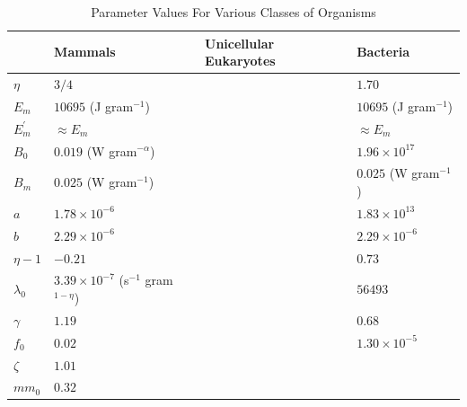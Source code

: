 \documentclass{pnastwo}
\begin{document}
\begin{table}[h]
\caption{Parameter Values For Various Classes of Organisms}
\label{param}
    \begin{center}
    \small
     \begin{tabular}{| p{1.2cm}| p{3.2cm} | p{2.6cm} | p{3.2cm} | }
     \hline
     & {\bf Mammals} & {\bf Unicellular Eukaryotes} & {\bf Bacteria} \\
     \hline
   $\eta$ & $3/4$ & & $1.70$ \\ 
   $E_{m}$ & $10695$ (J gram$^{-1}$) & & $10695$ (J gram$^{-1}$) \\ 
   $E_{m}^{\prime}$ & $\approx E_{m}$ & & $\approx E_{m}$ \\ 
   $B_{0}$ & $0.019$ (W gram$^{-\alpha}$) & & $1.96\times10^{17}$ \\
   $B_{m}$ & $0.025$ (W gram$^{-1}$)   & & $0.025$ (W gram$^{-1}$)\\
   $a$ & $1.78\times10^{-6}$ & & $1.83\times10^{13}$ \\ 
   $b$ & $2.29\times10^{-6}$ & & $2.29\times10^{-6}$ \\  
   $\eta-1$ & $-0.21$ & & $0.73$ \\ 
   $\lambda_{0}$ & $3.39\times10^{-7}$ (s$^{-1}$ gram$^{1-\eta}$) & & $56493$ \\ 
   $\gamma$ & $1.19$ & & $0.68$ \\ 
   $f_{0}$ & $0.02$ & & $1.30\times10^{-5}$ \\ 
   $\zeta$ & $1.01$ & & \\ 
   $mm_{0}$ & $0.32$ & & \\ 
   
      
   \hline
    \end{tabular}
    \end{center}
   \end{table}
\end{document}
